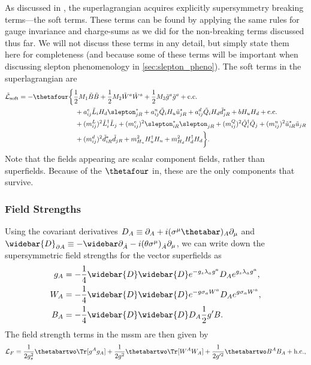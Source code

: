 As discussed in , the superlagrangian acquires explicitly supersymmetry breaking terms---the soft terms.
These terms can be found by applying the same rules for gauge invariance and charge-sums as we did for the non-breaking terms discussed thus far.
We will not discuss these terms in any detail, but simply state them here for completeness (and because some of these terms will be important when discussing slepton phenomenology in \cref{sec:slepton_pheno}). The soft terms in the superlagrangian are
\begin{equation}
\label{eq:soft_terms}
\begin{split}
    \tilde{\mathcal{L}}_{\text{soft}} = -\thetafour &\biggl\{
        \frac{1}{2}M_1 \tilde{B} \tilde{B} + \frac{1}{2}M_2 \tilde{W}^a \tilde{W}^a + \frac{1}{2}M_3 \tilde{g}^a\tilde{g}^a + \text{c.c.}
        \\ &\quad
        +a_{ij}^e \tilde{L}_i H_d \slepton_{jR}^* + a_{ij}^u \tilde{Q}_i H_u \tilde{u}_{jR}^* + a_{ij}^d \tilde{Q}_i H_d \tilde{d}_{jR}^* +bH_uH_d + \text{c.c.}
        \\ &\quad
        +(m_{ij}^L)^2 \tilde{L}_i^\dagger\tilde{L}_j + (m_{ij}^e)^2 \slepton_{iR}^*\slepton_{jR} + (m_{ij}^Q)^2 \tilde{Q}_i^\dagger \tilde{Q}_j + (m_{ij}^u)^2 \tilde{u}_{iR}^*\tilde{u}_{jR}
        \\ &\quad
        + (m_{ij}^d)^2 \tilde{d}_{iR}^* \tilde{d}_{jR} + m_{H_u}^2 H_u^\dagger H_u + m_{H_d}^2 H_d^\dagger H_d
    \biggr\}.
\end{split}
\end{equation}
Note that the fields appearing are scalar component fields, rather than superfields. Because of the $\thetafour$ in, these are the only components that survive.


\subsubsection{Field Strengths}

Using the covariant derivatives $D_A \equiv \partial_A + i(\sigma^\mu\thetabar)_A\partial_\mu$ and $\widebar{D}_{\partial{A}} \equiv -\widebar\partial_{\dot{A}} - i(\theta\sigma^\mu)_{\dot{A}} \partial_\mu$, we can write down the supersymmetric field strengths for the vector superfields as
\begin{subequations}
\begin{align}
    g_A &= -\frac{1}{4}\widebar{D}\widebar{D} e^{-g_s\lambda_a g^a} D_A e^{g_s\lambda_a g^a},
    \\
    W_A &= -\frac{1}{4}\widebar{D}\widebar{D} e^{-g\sigma_a W^a} D_A e^{g\sigma_a W^a},
    \\
    B_A &= -\frac{1}{4}\widebar{D}\widebar{D} D_A \frac{1}{2}g'B.
\end{align}
\end{subequations}
The field strength terms in the \gls{mssm} are then given by
\begin{equation}
    \mathcal{L}_F = \frac{1}{2g_s^2} \thetabartwo \Tr[g^A g_A] + \frac{1}{2g^2} \thetabartwo \Tr[W^A W_A] + \frac{1}{2g'^2} \thetabartwo B^A B_A + \text{h.c.},
\end{equation}



